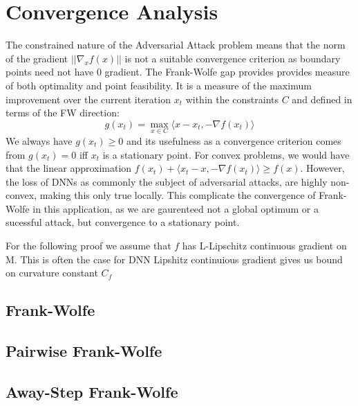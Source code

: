 \documentclass{article}
\begin{document}
\section{Convergence Analysis}
The constrained nature of the Adversarial Attack problem means that the norm of the gradient $||\nabla_x f(x)||$ is not a suitable convergence criterion as boundary points need not have $0$ gradient. 
The Frank-Wolfe gap provides provides measure of both optimality and point feasibility. It is a measure of the maximum improvement over the current iteration $x_t$ within the constraints $C$ and defined in terms of the FW direction: 
$$g(x_t) = \max_{x\in C} \langle x - x_t, -\nabla f(x_t)\rangle$$
We always have $g(x_t) \geq 0$ and its usefulness as a convergence criterion comes from $g(x_t) = 0$ iff $x_t$ is a stationary point. 
For convex problems, we would have that the linear approximation $f(x_t) + \langle x_t - x, -\nabla f(x_t) \rangle \geq f(x)$. However, the loss of DNNs as commonly the subject of adversarial attacks, are highly non-convex, making this only true locally. This complicate the convergence of Frank-Wolfe in this application, as we are gaurenteed not a global optimum or a sucessful attack, but convergence to a stationary point. 

For the following proof we assume that $f$ has L-Lipschitz continuous gradient on M. 
This is often the case for DNN %
Lipshitz continuious gradient gives us bound on curvature constant $C_f$ %

\subsection{Frank-Wolfe}
\subsection{Pairwise Frank-Wolfe}
\subsection{Away-Step Frank-Wolfe}
\end{document}
